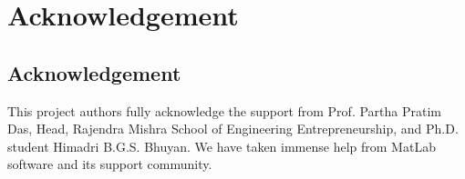 \chapter{Acknowledgement} %

\label{Chapter 8} 

\section{Acknowledgement}

This project authors fully acknowledge the support from Prof. Partha Pratim Das, Head, Rajendra Mishra School of Engineering Entrepreneurship, and Ph.D. student Himadri B.G.S. Bhuyan. We have taken immense help from MatLab software and its support community.
